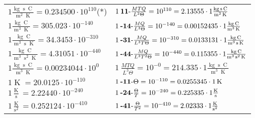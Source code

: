 \begin{center}
\begin{longtable}{l l}
{\color{black}$1 \bm{\mathrm{ }}\frac{\operatorname{kg}\operatorname{s}\operatorname{C}}{\operatorname{m}^2\operatorname{K}} = 0.234500\cdot10^{110} $}\quad(*)&
	{\color{black}$1\:\text{\textbf{11}-} \frac{MTQ}{L^2\Theta}=10^{110} = 2.13555 \cdot 1 \bm{\mathrm{ }}\frac{\operatorname{kg}\operatorname{s}\operatorname{C}}{\operatorname{m}^2\operatorname{K}}$}\\
{\color{black}$1 \bm{\mathrm{ }}\frac{\operatorname{kg}\operatorname{C}}{\operatorname{m}^3\operatorname{K}} = 305.023\cdot10^{-140} $}&
	{\color{black}$1\:\text{\textbf{-14}-} \frac{MQ}{L^3\Theta}=10^{-140} = 0.00152435 \cdot 1 \bm{\mathrm{ }}\frac{\operatorname{kg}\operatorname{C}}{\operatorname{m}^3\operatorname{K}}$}\\
{\color{black}$1 \bm{\mathrm{ }}\frac{\operatorname{kg}\operatorname{C}}{\operatorname{m}^3\operatorname{s}\operatorname{K}} = 34.3453\cdot10^{-310} $}&
	{\color{black}$1\:\text{\textbf{-31}-} \frac{MQ}{L^3T\Theta}=10^{-310} = 0.0133131 \cdot 1 \bm{\mathrm{ }}\frac{\operatorname{kg}\operatorname{C}}{\operatorname{m}^3\operatorname{s}\operatorname{K}}$}\\
{\color{black}$1 \bm{\mathrm{ }}\frac{\operatorname{kg}\operatorname{C}}{\operatorname{m}^3\operatorname{s}^2\operatorname{K}} = 4.31051\cdot10^{-440} $}&
	{\color{black}$1\:\text{\textbf{-44}-} \frac{MQ}{L^3T^2\Theta}=10^{-440} = 0.115355 \cdot 1 \bm{\mathrm{ }}\frac{\operatorname{kg}\operatorname{C}}{\operatorname{m}^3\operatorname{s}^2\operatorname{K}}$}\\
{\color{black}$1 \bm{\mathrm{ }}\frac{\operatorname{kg}\operatorname{s}\operatorname{C}}{\operatorname{m}^3\operatorname{K}} = 0.00234044\cdot10^{0} $}&
	{\color{black}$1\:\text{} \frac{MTQ}{L^3\Theta}=10^{-0} = 214.335 \cdot 1 \bm{\mathrm{ }}\frac{\operatorname{kg}\operatorname{s}\operatorname{C}}{\operatorname{m}^3\operatorname{K}}$}\\
\hline{\color{black}$1 \bm{\mathrm{ }}\operatorname{K} = 20.0125\cdot10^{-110} $}&
	{\color{black}$1\:\text{\textbf{-11}-} \Theta=10^{-110} = 0.0255345 \cdot 1 \bm{\mathrm{ }}\operatorname{K}$}\\
{\color{black}$1 \bm{\mathrm{ }}\frac{\operatorname{K}}{\operatorname{s}} = 2.22440\cdot10^{-240} $}&
	{\color{black}$1\:\text{\textbf{-24}-} \frac{\Theta}{T}=10^{-240} = 0.225335 \cdot 1 \bm{\mathrm{ }}\frac{\operatorname{K}}{\operatorname{s}}$}\\
{\color{black}$1 \bm{\mathrm{ }}\frac{\operatorname{K}}{\operatorname{s}^2} = 0.252124\cdot10^{-410} $}&
	{\color{black}$1\:\text{\textbf{-41}-} \frac{\Theta}{T^2}=10^{-410} = 2.02333 \cdot 1 \bm{\mathrm{ }}\frac{\operatorname{K}}{\operatorname{s}^2}$}\\

\end{longtable}
\end{center}

